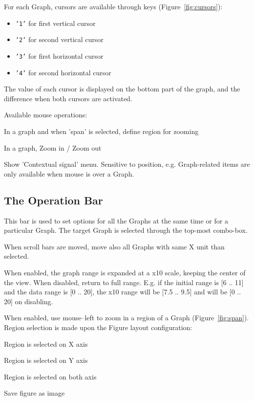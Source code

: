 \documentclass[a4paper,11pt]{report}
\renewenvironment{description}{%
\begin{basedescript}{%
\renewcommand{\makelabel}[1]{\bfseries##1}%
}%
}{%
\end{basedescript}%
}
\begin{document}
For each Graph, cursors are available through keys (Figure~\ref{fig:cursors}):
\begin{itemize}
\item \texttt{'1'} for first vertical cursor
\item \texttt{'2'} for second vertical cursor
\item \texttt{'3'} for first horizontal cursor
\item \texttt{'4'} for second horizontal cursor
\end{itemize}
The value of each cursor is displayed on the bottom part of the graph, and the difference when both cursors are activated.

\noindent Available mouse operations:
\begin{description}
\item[left] In a graph and when 'span' is selected, define region for zooming
\item[roll] In a graph, Zoom in / Zoom out
\item[right] Show 'Contextual signal' menu. Sensitive to position, e.g. Graph-related items are only available when mouse is over a Graph.
\end{description}


\subsection{The Operation Bar}

This bar is used to set options for all the Graphs at the same time or for a particular Graph.
The target Graph is selected through the top-most combo-box.
\begin{description}
\item[Master pan] When scroll bars are moved, move also all Graphs with same X unit than selected.
\item[Zoom x10] When enabled, the graph range is expanded at a x10 scale, keeping the center of the view. When disabled, return to full range. E.g. if the initial range is [6 .. 11] and the data range is [0 .. 20], the x10 range will be [7.5 .. 9.5] and will be [0 .. 20] on disabling.
\item[Span] When enabled, use mouse--left to zoom in a region of a Graph (Figure~\ref{fig:span}). Region selection is made upon the Figure layout configuration:
  \begin{description}
  \item[horizontal] Region is selected on X axis
  \item[vertical] Region is selected on Y axis
  \item[quad] Region is selected on both axis
  \end{description}
\item[Export] Save figure as image
\end{description}
\end{document}
